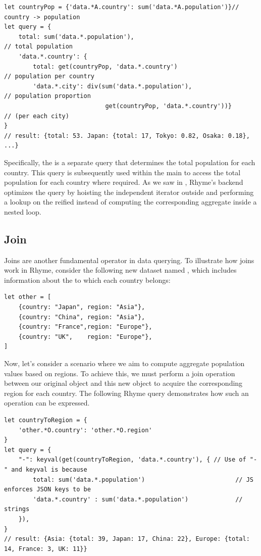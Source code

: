\documentclass[runningheads]{llncs}
\newcommand{\lang}{Rhyme}
\begin{document}
\begin{lstlisting}[style=JavaScript, columns=flexible, numbers=none]
let countryPop = {'data.*A.country': sum('data.*A.population')}// country -> population
let query = { 
    total: sum('data.*.population'),                                  // total population
    'data.*.country': {
        total: get(countryPop, 'data.*.country')                      // population per country
        'data.*.city': div(sum('data.*.population'),                  // population proportion
                            get(countryPop, 'data.*.country'))}       // (per each city)
}
// result: {total: 53. Japan: {total: 17, Tokyo: 0.82, Osaka: 0.18}, ...}
\end{lstlisting}

Specifically, the  is a separate query that determines the total
population for each country.
This query is subsequently used within the main  to access the
total population for each country where required.
As we saw in , \lang{}'s backend optimizes the
query by hoisting the independent  iterator outside and performing
a lookup on the reified  instead of computing the
corresponding aggregate inside a nested loop.

\subsection{Join}
Joins are another fundamental operator in data querying.
To illustrate how joins work in \lang{}, consider the following
new dataset named , which includes information about the
 to which each country belongs:

\begin{lstlisting}[style=JavaScript, columns=flexible]
let other = [
    {country: "Japan", region: "Asia"},
    {country: "China", region: "Asia"},
    {country: "France",region: "Europe"},
    {country: "UK",    region: "Europe"},
]
\end{lstlisting}

Now, let's consider a scenario where we aim to compute aggregate population
values based on regions.
To achieve this, we must perform a join operation between our original
 object and this new  object to acquire the
corresponding region for each country.
The following \lang{} query demonstrates how such an operation can be
expressed.

\begin{lstlisting}[style=JavaScript, columns=flexible]
let countryToRegion = {
    'other.*O.country': 'other.*O.region'
}
let query = {
    "-": keyval(get(countryToRegion, 'data.*.country'), { // Use of "-" and keyval is because
        total: sum('data.*.population')                         // JS enforces JSON keys to be
        'data.*.country' : sum('data.*.population')             // strings
    }),
}
// result: {Asia: {total: 39, Japan: 17, China: 22}, Europe: {total: 14, France: 3, UK: 11}}
\end{lstlisting}
\end{document}
